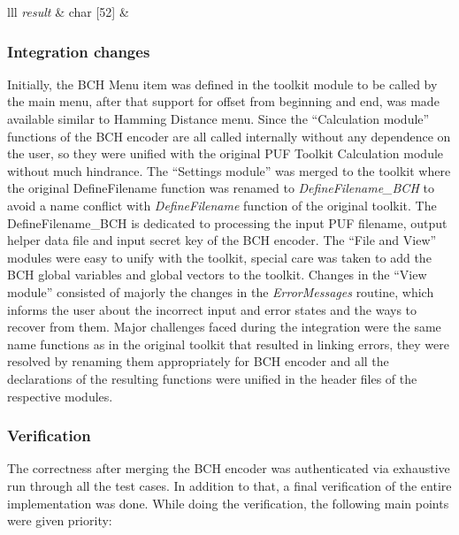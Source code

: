 \begin{table}[]
\begin{center}
\begin{tabular}{lll}
	\emph{result} & char [52] & \\
	\hline
	\addlinespace
	\bottomrule
	\end{tabular}
	\end{center}
	\caption{Names and types of each element in the data structure \emph{Item} for the \emph{PUF BCH Encoder} and a description regarding their purpose.}
	\label{tab:4_BCH_item_type_limits}
	\end{table}

	\subsubsection{Integration changes}
	Initially, the BCH Menu item was defined in the toolkit module to be called by the main menu, after that support for offset from beginning and end, was made available similar to Hamming Distance menu. Since the ``Calculation module'' functions of the BCH encoder are all called internally without any dependence on the user, so they were unified with the original PUF Toolkit Calculation module without much hindrance.
	The ``Settings module'' was merged to the toolkit where the original DefineFilename function was renamed to \emph{DefineFilename\_BCH} to avoid a name conflict with \emph{DefineFilename} function of the original toolkit. The DefineFilename\_BCH is dedicated to processing the input PUF filename, output helper data file and input secret key of the BCH encoder. The ``File and View'' modules were easy to unify with the toolkit, special care was taken to add the BCH global variables and global vectors to the toolkit. Changes in the ``View
	module'' consisted of majorly the changes in the \emph{ErrorMessages} routine, which informs the user about the incorrect input and error states and the ways to recover from them. Major challenges faced during the integration were the same name functions as in the original toolkit that resulted in linking errors, they were resolved by renaming them appropriately for BCH encoder and all the declarations of the resulting functions were unified in the header files of the respective modules.\\

	\subsubsection{Verification}
	The correctness after merging the BCH encoder was authenticated via exhaustive run through all the test cases. In addition to that, a final verification of the entire implementation was done. While doing the verification, the following main points were given priority:

